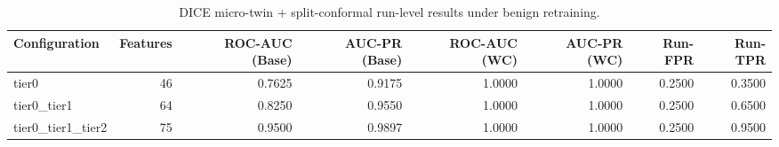 \begin{table}[t]
\centering
\caption{DICE micro-twin + split-conformal run-level results under benign retraining.}
\label{tab:dice_full_overall}
\footnotesize
\begin{tabular}{lrrrrrrr}
\toprule
Configuration & Features & ROC-AUC (Base) & AUC-PR (Base) & ROC-AUC (WC) & AUC-PR (WC) & Run-FPR & Run-TPR \\
\midrule
tier0 & 46 & 0.7625 & 0.9175 & 1.0000 & 1.0000 & 0.2500 & 0.3500 \\
tier0_tier1 & 64 & 0.8250 & 0.9550 & 1.0000 & 1.0000 & 0.2500 & 0.6500 \\
tier0_tier1_tier2 & 75 & 0.9500 & 0.9897 & 1.0000 & 1.0000 & 0.2500 & 0.9500 \\
\bottomrule
\end{tabular}

\end{table}

